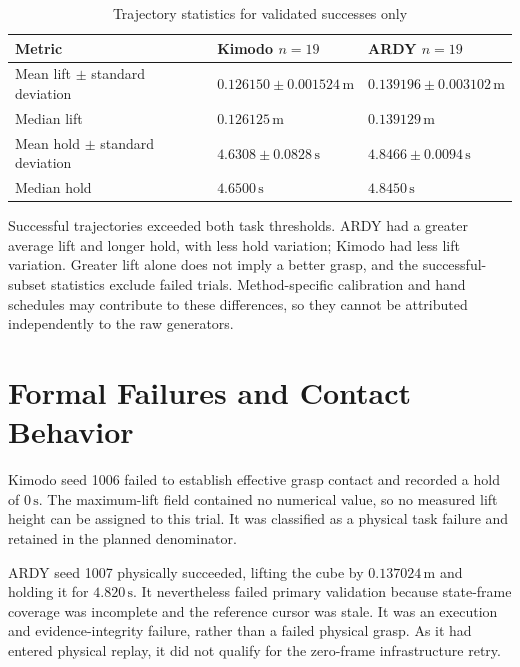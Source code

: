 \documentclass[11pt,a4paper]{article}
\begin{document}
\begin{table}[H]
\centering
\caption{Trajectory statistics for validated successes only}
\label{tab:comparison-4}
\small
\begin{tabularx}{\linewidth}{|Y|C{\tabcolsep\relax}|C{\tabcolsep\relax}|}
\hline
{}
\textbf{Metric} & \textbf{Kimodo  \(n = 19\)} & \textbf{ARDY  \(n = 19\)} \\ \hline
Mean lift \(\pm\) standard deviation & \(0.126150 \pm 0.001524\,\mathrm{m}\) & \(0.139196 \pm 0.003102\,\mathrm{m}\) \\ \hline
Median lift & \(0.126125\,\mathrm{m}\) & \(0.139129\,\mathrm{m}\) \\ \hline
Mean hold \(\pm\) standard deviation & \(4.6308 \pm 0.0828\,\mathrm{s}\) & \(4.8466 \pm 0.0094\,\mathrm{s}\) \\ \hline
Median hold & \(4.6500\,\mathrm{s}\) & \(4.8450\,\mathrm{s}\) \\ \hline
\end{tabularx}
\end{table}

Successful trajectories exceeded both task thresholds. ARDY had a greater average lift and longer hold, with less hold variation; Kimodo had less lift variation. Greater lift alone does not imply a better grasp, and the successful-subset statistics exclude failed trials. Method-specific calibration and hand schedules may contribute to these differences, so they cannot be attributed independently to the raw generators.

\section*{Formal Failures and Contact Behavior}

Kimodo seed 1006 failed to establish effective grasp contact and recorded a hold of \(0\,\mathrm{s}\). The maximum-lift field contained no numerical value, so no measured lift height can be assigned to this trial. It was classified as a physical task failure and retained in the planned denominator.

ARDY seed 1007 physically succeeded, lifting the cube by \(0.137024\,\mathrm{m}\) and holding it for \(4.820\,\mathrm{s}\). It nevertheless failed primary validation because state-frame coverage was incomplete and the reference cursor was stale. It was an execution and evidence-integrity failure, rather than a failed physical grasp. As it had entered physical replay, it did not qualify for the zero-frame infrastructure retry.
\end{document}
